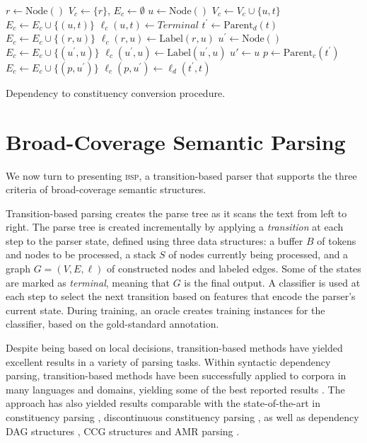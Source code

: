 \documentclass[11pt]{article}
\begin{document}
\begin{algorithm}
  \small
 $r \leftarrow \mathrm{Node()}$\;
 $V_c \leftarrow \{r\}$,
 $E_c \leftarrow \emptyset$\;
  {
  $u \leftarrow \mathrm{Node()}$\;
  $V_c \leftarrow V_c \cup \{u, t\}$\;
  $E_c \leftarrow E_c \cup \{(u, t)\}$\;
  $\ell_c(u,t)\leftarrow\mathit{Terminal}$\;
  $t^\prime \leftarrow \mathrm{Parent}_d(t)$\;
   {
   $E_c \leftarrow E_c \cup \{(r, u)\}$\;
   $\ell_c(r, u) \leftarrow \mathrm{Label}(r,u)$\;
  } {
    {
    $u^\prime \leftarrow \mathrm{Node()}$\;
    $E_c \leftarrow E_c \cup \{(u^\prime, u)\}$\;
    $\ell_c(u^\prime, u) \leftarrow \mathrm{Label}(u^\prime, u)$\;
   } {
    $u' \leftarrow u$\;
   }
   $p \leftarrow \mathrm{Parent}_c(t^\prime)$\;
   $E_c \leftarrow E_c \cup \{(p, u^\prime)\}$\;
   $\ell_c(p, u^\prime) \leftarrow \ell_d(t^\prime, t)$\;
  }
 }
 \caption{\small Dependency to constituency conversion procedure.}
 \label{alg:dep2con}
\end{algorithm}


\section{Broad-Coverage Semantic Parsing}\label{sec:direct_approach}

We now turn to presenting \textsc{bsp},
a transition-based parser that supports the three criteria of broad-coverage
semantic structures.

Transition-based parsing \cite{Nivre03anefficient} creates the parse tree
as it scans the text from left to right.
The parse tree is created incrementally by applying a \textit{transition} at each step to the parser state,
defined using three data structures: a buffer $B$ of tokens and nodes to be processed,
a stack $S$ of nodes currently being processed,
and a graph $G=(V,E,\ell)$ of constructed nodes and labeled edges.
Some of the states are marked as \textit{terminal}, meaning that $G$ is the final output.
A classifier is used at each step to select the next transition based on features
that encode the parser's current state.
During training, an oracle creates training instances for the classifier,
based on the gold-standard annotation.

Despite being based on local decisions, transition-based methods have yielded excellent
results in a variety of parsing tasks.
Within syntactic dependency parsing, transition-based methods
have been successfully applied to corpora in many languages and domains, yielding some
of the best reported results \cite{dyer2015transition,ballesteros2015improved}. 
The approach has also yielded results comparable with the state-of-the-art in
constituency parsing \cite{sagae2005classifier,zhang2009transition,zhu2013fast},
discontinuous constituency parsing \cite{maier2015discontinuous},
as well as dependency DAG structures
\cite{sagae2008shift,tokgoz2015transition}, CCG structures \cite{ambati2015incremental}
and AMR parsing \cite{wang2015transition}.
\end{document}
